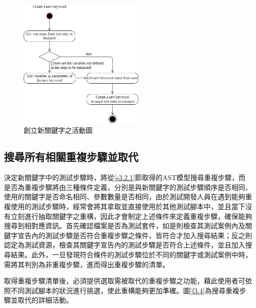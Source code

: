 \begin{figure}[H]
    \centering
    \includegraphics[width=0.55\textwidth]{picture/Create_a_new_keyword.png}
    \caption{創立新關鍵字之活動圖}
    \label{f3.3}
\end{figure}

\subsection{搜尋所有相關重複步驟並取代}\label{s3.2.3}
\indent
決定新關鍵字中的測試步驟時，將從\ref{s3.2.1}節取得的AST模型搜尋重複步驟，而是否為重複步驟將由三種條件定義，分別是與新關鍵字的測試步驟順序是否相同、使用的關鍵字是否命名相同、參數數量是否相同，由於測試開發人員在遇到能夠重複使用的測試步驟時，經常會將其拿取並直接使用於其他測試腳本中，並且當下沒有立刻進行抽取關鍵字之重構，因此才會制定上述條件來定義重複步驟，確保能夠搜尋到相對應資訊。首先確認檔案是否為測試套件，如是則檢查其測試案例內及關鍵字宣告內的測試步驟是否符合重複步驟之條件，皆符合才加入搜尋結果；反之則認定為測試資源，檢查其關鍵字宣告內的測試步驟是否符合上述條件，並且加入搜尋結果。此外，一旦發現符合條件的測試步驟位於不同的關鍵字或測試案例中時，需將其判別為非重複步驟，進而得出重複步驟的清單。

\indent
取得重複步驟清單後，必須提供選取需被取代的重複步驟之功能，藉此使用者可依照不同測試腳本的狀況進行挑選，使此重構能夠更加準確。圖\ref{f3.4}為搜尋重複步驟並取代的詳細活動。

